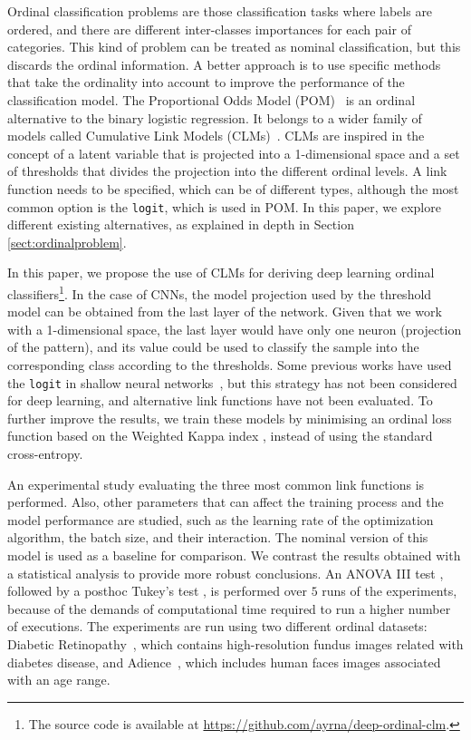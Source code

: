 \documentclass[journal]{IEEEtran}
\begin{document}
	Ordinal classification problems are those classification tasks where labels are ordered, and there are different inter-classes importances for each pair of categories. This kind of problem can be treated as nominal classification, but this discards the ordinal information. A better approach is to use specific methods that take the ordinality into account to improve the performance of the classification model. The Proportional Odds Model (POM)~\cite{mccullagh1980regression} is an ordinal alternative to the binary logistic regression. It belongs to a wider family of models called Cumulative Link Models (CLMs)~\cite{agresti2010analysis}. CLMs are inspired in the concept of a latent variable that is projected into a 1-dimensional space and a set of thresholds that divides the projection into the different ordinal levels. A link function needs to be specified, which can be of different types, although the most common option is the \texttt{logit}, which is used in POM. In this paper, we explore different existing alternatives, as explained in depth in Section \ref{sect:ordinalproblem}.
	
	In this paper, we propose the use of CLMs for deriving deep learning ordinal classifiers\footnote{The source code is available at \url{https://github.com/ayrna/deep-ordinal-clm}.}. In the case of CNNs, the model projection used by the threshold model can be obtained from the last layer of the network. Given that we work with a 1-dimensional space, the last layer would have only one neuron (projection of the pattern), and its value could be used to classify the sample into the corresponding class according to the thresholds. Some previous works have used the \texttt{logit} in shallow neural networks~\cite{gutierrez2016ordinal}, but this strategy has not been considered for deep learning, and alternative link functions have not been evaluated. To further improve the results, we train these models by minimising an ordinal loss function based on the Weighted Kappa index \cite{de2018weighted}, instead of using the standard cross-entropy.
	
	An experimental study evaluating the three most common link functions is performed. Also, other parameters that can affect the training process and the model performance are studied, such as the learning rate of the optimization algorithm, the batch size, and their interaction. The nominal version of this model is used as a baseline for comparison. We contrast the results obtained with a statistical analysis to provide more robust conclusions. An ANOVA III test \cite{miller1997beyond}, followed by a posthoc Tukey's test \cite{tukey1949comparing}, is performed over $5$ runs of the experiments, because of the demands of computational time required to run a higher number of executions. The experiments are run using two different ordinal datasets: Diabetic Retinopathy~\cite{de2018weighted}, which contains high-resolution fundus images related with diabetes disease, and Adience~\cite{beckham2017unimodal}, which includes human faces images associated with an age range.
	
\end{document}
